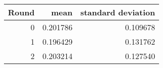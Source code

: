 \begin{tabular}{rrr}
\toprule
 Round &      mean &  standard deviation \\
\midrule
     0 &  0.201786 &            0.109678 \\
     1 &  0.196429 &            0.131762 \\
     2 &  0.203214 &            0.127540 \\
\bottomrule
\end{tabular}
